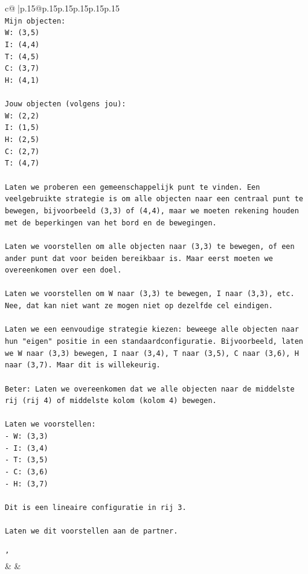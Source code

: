 \documentclass{article}
\begin{document}
{\begin{supertabular}{c@{$\;$}|p{.15\linewidth}@{}p{.15\linewidth}p{.15\linewidth}p{.15\linewidth}p{.15\linewidth}p{.15\linewidth}}
{{{\\ 
\texttt{Mijn objecten:} \\
\texttt{W: (3,5)} \\
\texttt{I: (4,4)} \\
\texttt{T: (4,5)} \\
\texttt{C: (3,7)} \\
\texttt{H: (4,1)} \\
\\ 
\texttt{Jouw objecten (volgens jou):} \\
\texttt{W: (2,2)} \\
\texttt{I: (1,5)} \\
\texttt{H: (2,5)} \\
\texttt{C: (2,7)} \\
\texttt{T: (4,7)} \\
\\ 
\texttt{Laten we proberen een gemeenschappelijk punt te vinden. Een veelgebruikte strategie is om alle objecten naar een centraal punt te bewegen, bijvoorbeeld (3,3) of (4,4), maar we moeten rekening houden met de beperkingen van het bord en de bewegingen.} \\
\\ 
\texttt{Laten we voorstellen om alle objecten naar (3,3) te bewegen, of een ander punt dat voor beiden bereikbaar is. Maar eerst moeten we overeenkomen over een doel.} \\
\\ 
\texttt{Laten we voorstellen om W naar (3,3) te bewegen, I naar (3,3), etc. Nee, dat kan niet want ze mogen niet op dezelfde cel eindigen.} \\
\\ 
\texttt{Laten we een eenvoudige strategie kiezen: beweege alle objecten naar hun "eigen" positie in een standaardconfiguratie. Bijvoorbeeld, laten we W naar (3,3) bewegen, I naar (3,4), T naar (3,5), C naar (3,6), H naar (3,7). Maar dit is willekeurig.} \\
\\ 
\texttt{Beter: Laten we overeenkomen dat we alle objecten naar de middelste rij (rij 4) of middelste kolom (kolom 4) bewegen.} \\
\\ 
\texttt{Laten we voorstellen:} \\
\texttt{{-} W: (3,3)} \\
\texttt{{-} I: (3,4)} \\
\texttt{{-} T: (3,5)} \\
\texttt{{-} C: (3,6)} \\
\texttt{{-} H: (3,7)} \\
\\ 
\texttt{Dit is een lineaire configuratie in rij 3.} \\
\\ 
\texttt{Laten we dit voorstellen aan de partner.} \\
\\ 
\texttt{'} \\
            }
        }
    }
    & & \\ \\


\end{supertabular}}
\end{document}
